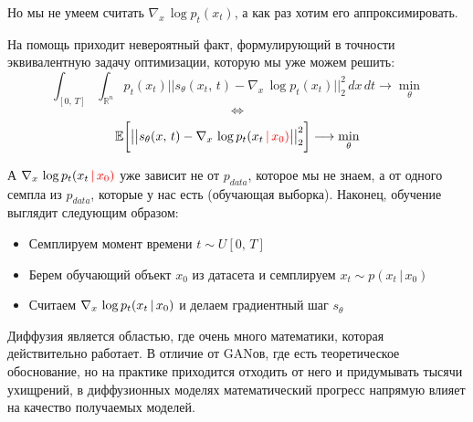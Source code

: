 \documentclass[12pt]{article}
\def\R{\mathbb{R}}       %
\theoremstyle{definition} %
\theoremstyle{plain} %
\theoremstyle{remark} %
\begin{document}
    Но мы не умеем считать $\nabla_x \, \log p_t(x_t)$, а как раз хотим его аппроксимировать.

    \pagebreak

    На помощь приходит невероятный факт, формулирующий в точности эквивалентную задачу оптимизации, которую мы уже можем решить:
    \[
    \int_{[0, \, T]}\int_{\R^n} p_t(x_t) \big|\big| s_\theta(x_t, \, t) -  \nabla_x \, \log p_t(x_t)\big|\big|_2^2 \, dx\,dt \rightarrow \min_{\theta}
    \]
    \[
    \Longleftrightarrow
    \]
    \[
    \mathbb{E} \bigg[\big|\big| s_\theta(x, \, t) -  \nabla_x \, \log p_t(x_t \, \textcolor{red}{| \, x_0)}\big|\big|_2^2\bigg] \longrightarrow \min_{\theta}
    \]

    А $\nabla_x \, \log p_t(x_t \, \textcolor{red}{| \, x_0)}$ уже зависит не от $p_{data}$, которое мы не знаем, а от одного семпла из $p_{data}$, которые у нас есть (обучающая выборка). Наконец, обучение выглядит следующим образом:
    \begin{itemize}
        \item Семплируем момент времени $t \sim U[0, \, T]$
        \item Берем обучающий объект $x_0$ из датасета и семплируем $x_t \sim p(x_t \, | \, x_0)$
        \item Считаем $\nabla_x \, \log p_t(x_t \, \textcolor{black}{| \, x_0)}$ и делаем градиентный шаг $s_\theta$
    \end{itemize}

\begin{center}
    \end{center}

    Диффузия является областью, где очень много математики, которая действительно работает. В отличие от GANов, где есть теоретическое обоснование, но на практике приходится отходить от него и придумывать тысячи ухищрений, в диффузионных моделях математический прогресс напрямую влияет на качество получаемых моделей. \\
\end{document}
